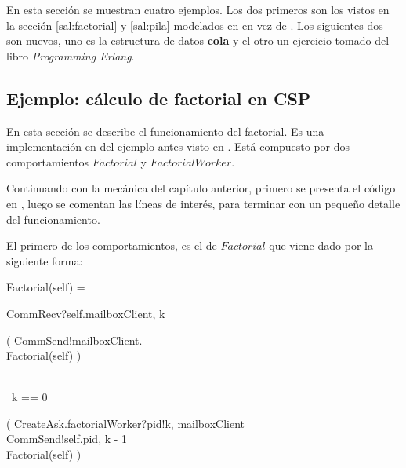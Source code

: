 En esta sección se muestran cuatro ejemplos. Los dos primeros son los vistos en la sección \ref{sal:factorial} y \ref{sal:pila} modelados en \CSP en vez de \SAL. Los siguientes dos son nuevos, uno es la estructura de datos \textbf{cola} y el otro un ejercicio tomado del libro \textit{Programming Erlang}\cite{Cesarini:2009:EP:1717841}.

\subsection{Ejemplo: cálculo de factorial en CSP}
En esta sección se describe el funcionamiento del factorial. Es una implementación en \CSP del ejemplo antes visto en \SAL. Está compuesto por dos comportamientos $Factorial$ y $FactorialWorker$.

Continuando con la mecánica del capítulo anterior, primero se presenta el código en \CSP, luego se comentan las líneas de interés, para terminar con un pequeño detalle del funcionamiento.

El primero de los comportamientos, es el de $Factorial$ que viene dado por la siguiente forma:
\begin{process}
Factorial(self) = {} \\ \quad
  \begin{block}
  CommRecv?self.\langle mailboxClient, k \rangle \then {} \\ \quad
    \begin{block} \quad
      \begin{block} 
      ( CommSend!mailboxClient. \rangle \then \\
      Factorial(self) )
      \end{block} \\
     {} \lceil\ k == 0\ \rceil  \\ \quad
      \begin{block}
      ( CreateAsk.factorialWorker?pid!\langle k, mailboxClient \rangle \then \\
      CommSend!self.\langle pid, k - 1 \rangle \then \\
      Factorial(self) )
      \end{block}
    \end{block}
  \end{block}
\end{process}


